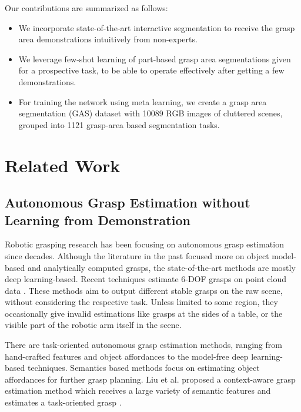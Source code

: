 \documentclass[letterpaper]{article} %
\begin{document}
Our contributions are summarized as follows:
\begin{itemize}
\item We incorporate state-of-the-art interactive segmentation to receive the grasp area demonstrations intuitively from non-experts.

\item We leverage few-shot learning of part-based grasp area segmentations given for a prospective task, to be able to operate effectively after getting a few demonstrations.

\item For training the network using meta learning, we create a  grasp area segmentation (GAS) dataset with 10089 RGB images of cluttered scenes, grouped into 1121 grasp-area based segmentation tasks.
\end{itemize}


\section{Related Work}
\label{sec:related}

\subsection{Autonomous Grasp Estimation without Learning from Demonstration}
Robotic grasping research has been focusing on autonomous grasp estimation since decades. Although the literature in the past focused more on object model-based and analytically computed grasps, the state-of-the-art methods are mostly deep learning-based. Recent techniques estimate 6-DOF grasps on point cloud data  \cite{sundermeyer2021contact,mousavian20196,fang2020graspnet,liang2019pointnetgpd}.
These methods aim to output different stable grasps on the raw scene, without considering the respective task. Unless limited to some region, they occasionally give invalid estimations like grasps at the sides of a table, or the visible part of the robotic arm itself in the scene.

There are task-oriented autonomous grasp estimation methods, ranging from hand-crafted features and object affordances to the model-free deep learning-based techniques. Semantics based methods focus on estimating object affordances \cite{do2018affordancenet} for further grasp planning.
Liu et al.  proposed a context-aware grasp estimation method which receives a large variety of semantic features and estimates a task-oriented grasp \cite{liu2020cage}.
\end{document}
